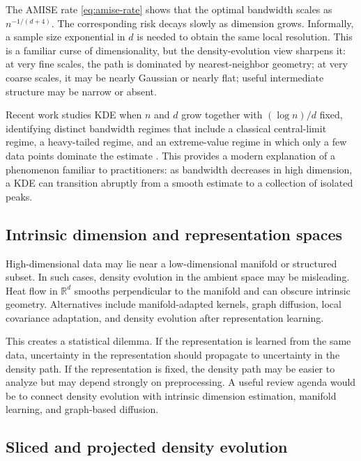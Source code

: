 \documentclass[preprint]{imsart}
\theoremstyle{plain}
\theoremstyle{definition}
\newcommand{\R}{\mathbb{R}}
\begin{document}
The AMISE rate \eqref{eq:amise-rate} shows that the optimal bandwidth scales as $n^{-1/(d+4)}$. The corresponding risk decays slowly as dimension grows. Informally, a sample size exponential in $d$ is needed to obtain the same local resolution. This is a familiar curse of dimensionality, but the density-evolution view sharpens it: at very fine scales, the path is dominated by nearest-neighbor geometry; at very coarse scales, it may be nearly Gaussian or nearly flat; useful intermediate structure may be narrow or absent.

Recent work studies KDE when $n$ and $d$ grow together with
$(\log n)/d$ fixed, identifying distinct bandwidth regimes that include a
classical central-limit regime, a heavy-tailed regime, and an
extreme-value regime in which only a few data points dominate the estimate
\citep{biroli_2026_KernelDensityEstimators}. This provides a modern explanation of a phenomenon familiar to practitioners: as bandwidth decreases in high dimension, a KDE can
transition abruptly from a smooth estimate to a collection of isolated
peaks.

\subsection{Intrinsic dimension and representation spaces}
\label{subsec:intrinsic}

High-dimensional data may lie near a low-dimensional manifold or structured subset. In such cases, density evolution in the ambient space may be misleading. Heat flow in $\R^d$ smooths perpendicular to the manifold and can obscure intrinsic geometry. Alternatives include manifold-adapted kernels, graph diffusion, local covariance adaptation, and density evolution after representation learning.

This creates a statistical dilemma. If the representation is learned from the same data, uncertainty in the representation should propagate to uncertainty in the density path. If the representation is fixed, the density path may be easier to analyze but may depend strongly on preprocessing. A useful review agenda would be to connect density evolution with intrinsic dimension estimation, manifold learning, and graph-based diffusion.

\subsection{Sliced and projected density evolution}
\label{subsec:sliced}
\end{document}
